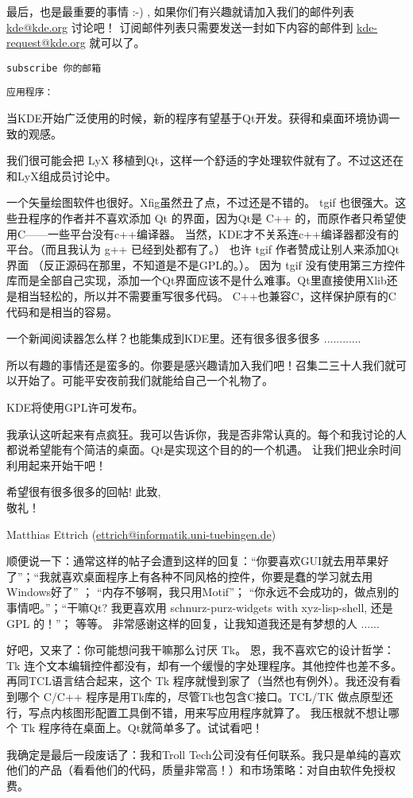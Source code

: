 \documentclass[amstex,twoside]{ctexbook}
\newenvironment{insertnote}{ \ttfamily\CJKfamily{KaiTi} }{\vskip 0.5cm }
\newcommand{\email}[1]{\href{mailto:#1}{#1}}
\begin{document}
\begin{insertnote}
{	最后，也是最重要的事情 :-) , 如果你们有兴趣就请加入我们的邮件列表  \email{kde@kde.org} 讨论吧！
	订阅邮件列表只需要发送一封如下内容的邮件到 \email{kde-request@kde.org} 就可以了。
	
\begin{center}
	{\tt subscribe 你的邮箱}
\end{center}


{ \noindent \tt 应用程序：}

	当KDE开始广泛使用的时候，新的程序有望基于Qt开发。获得和桌面环境协调一致的观感。

    我们很可能会把 LyX 移植到Qt，这样一个舒适的字处理软件就有了。不过这还在和LyX组成员讨论中。

    一个矢量绘图软件也很好。Xfig虽然丑了点，不过还是不错的。 tgif 也很强大。这些丑程序的作者并不喜欢添加 Qt 的界面，因为Qt是 C++ 的，而原作者只希望使用C——一些平台没有c++编译器。
    当然，KDE才不关系连c++编译器都没有的平台。（而且我认为 g++ 已经到处都有了。） 也许 tgif 作者赞成让别人来添加Qt界面 （反正源码在那里，不知道是不是GPL的。）。
    因为 tgif 没有使用第三方控件库而是全部自己实现，添加一个Qt界面应该不是什么难事。Qt里直接使用Xlib还是相当轻松的，所以并不需要重写很多代码。
    C++也兼容C，这样保护原有的C代码和是相当的容易。

    一个新闻阅读器怎么样？也能集成到KDE里。还有很多很多很多 ............

}

所以有趣的事情还是蛮多的。你要是感兴趣请加入我们吧！召集二三十人我们就可以开始了。可能平安夜前我们就能给自己一个礼物了。

KDE将使用GPL许可发布。

我承认这听起来有点疯狂。我可以告诉你，我是否非常认真的。每个和我讨论的人都说希望能有个简洁的桌面。Qt是实现这个目的的一个机遇。
让我们把业余时间利用起来开始干吧！

希望很有很多很多的回帖!
此致,\\
\qquad 敬礼！

Matthias Ettrich
(\email{ettrich@informatik.uni-tuebingen.de})

顺便说一下：通常这样的帖子会遭到这样的回复：“你要喜欢GUI就去用苹果好了”；“我就喜欢桌面程序上有各种不同风格的控件，你要是蠢的学习就去用Windows好了” ； “内存不够啊，我只用Motif”；
“你永远不会成功的，做点别的事情吧。”；“干嘛Qt? 我更喜欢用 schnurz-purz-widgets with xyz-lisp-shell, 还是 GPL 的！”； 等等。
非常感谢这样的回复，让我知道我还是有梦想的人 ......

好吧，又来了：你可能想问我干嘛那么讨厌 Tk。 恩，我不喜欢它的设计哲学： Tk 连个文本编辑控件都没有，却有一个缓慢的字处理程序。其他控件也差不多。
再同TCL语言结合起来，这个 Tk 程序就慢到家了（当然也有例外）。我还没有看到哪个 C/C++ 程序是用Tk库的，尽管Tk也包含C接口。TCL/TK 做点原型还行，写点内核图形配置工具倒不错，用来写应用程序就算了。
我压根就不想让哪个 Tk 程序待在桌面上。Qt就简单多了。试试看吧！

我确定是最后一段废话了：我和Troll Tech公司没有任何联系。我只是单纯的喜欢他们的产品（看看他们的代码，质量非常高！）和市场策略：对自由软件免授权费。

\end{insertnote}
\end{document}
